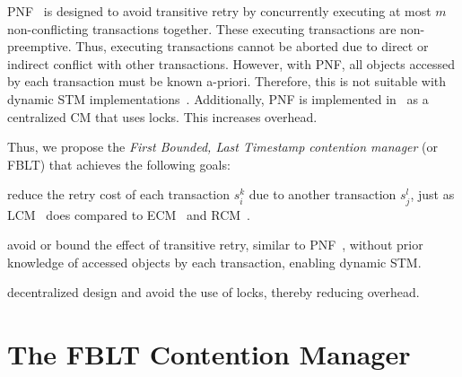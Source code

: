 \documentclass[conference,letterpaper]{IEEEtran}
\begin{document}
PNF~\cite{pnf_dac_asp,shambake_phd_proposal} is designed to avoid transitive retry by concurrently executing at most $m$ non-conflicting transactions together. These executing transactions are non-preemptive. Thus, executing transactions cannot be aborted due to direct or indirect conflict with other transactions. However, with PNF, all objects accessed by each transaction must be known a-priori. Therefore, this is not suitable with dynamic STM implementations~\cite{Herlihy:2003:STM:872035.872048}. Additionally, PNF is implemented in~\cite{shambake_phd_proposal} as a centralized CM that uses locks. This increases overhead. 

Thus, we propose the \textit{First Bounded, Last Timestamp contention manager} (or FBLT) that achieves the following goals:
\begin{compactenum}
\item \label{goal 1} reduce the retry cost of each transaction $s_i^k$ due to another transaction $s_j^l$, just as LCM~\cite{lcmdac2012} does compared to ECM~\cite{stmconcurrencycontrol:emsoft11} and RCM~\cite{stmconcurrencycontrol:emsoft11}.
\item \label{goal 2} avoid or bound the effect of transitive retry, similar to PNF~\cite{pnf_dac_asp,shambake_phd_proposal}, without prior knowledge of accessed objects by each transaction, enabling dynamic STM.
\item \label{goal 3} decentralized design and avoid the use of locks, thereby reducing  overhead.
\end{compactenum}

\section{The FBLT Contention Manager}
\label{sec:fblt design}
\end{document}
